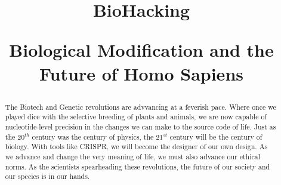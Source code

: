 \documentclass{article}
\title{BioHacking \\
\begin{large} 
    Biological Modification and the Future of Homo Sapiens
\end{large} }	%
\begin{document}
\maketitlepage
\newpage


\begin{abstract}
    The Biotech and Genetic revolutions are advvancing at a feverish pace.
    Where once we played dice with the selective breeding of plants and animals, we are now capable of nucleotide-level precision in the changes we can make to the source code of life.
    Just as the 20$^{th}$ century was the century of physics, the 21$^{st}$ century will be the century of biology.
    With tools like CRISPR, we will become the designer of our own design.
    As we advance and change the very meaning of life, we must also advance our ethical norms.
    As the scientists spearheading these revolutions, the future of our society and our species is in our hands.
\end{abstract}
\newpage

\makeheader	%
\maketitle	%






\newpage
\makeworkscited
\end{document}
